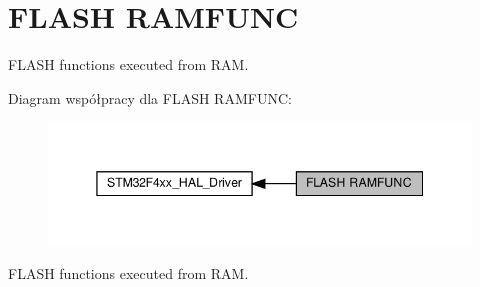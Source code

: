\hypertarget{group___f_l_a_s_h___r_a_m_f_u_n_c}{}\section{F\+L\+A\+SH R\+A\+M\+F\+U\+NC}
\label{group___f_l_a_s_h___r_a_m_f_u_n_c}


F\+L\+A\+SH functions executed from R\+AM.  


Diagram współpracy dla F\+L\+A\+SH R\+A\+M\+F\+U\+NC\+:\nopagebreak
\begin{figure}[H]
\begin{center}
\leavevmode
\includegraphics[width=345pt]{group___f_l_a_s_h___r_a_m_f_u_n_c}
\end{center}
\end{figure}
F\+L\+A\+SH functions executed from R\+AM. 

